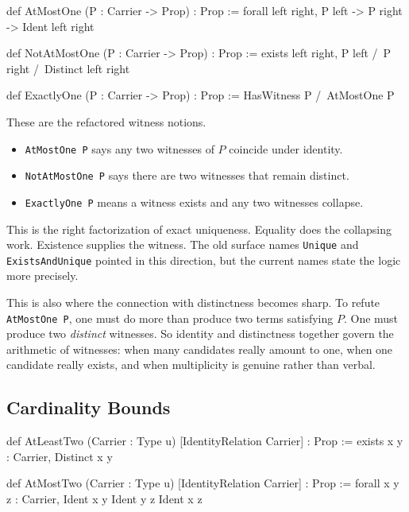 \documentclass[11pt]{article}
\newcommand{\leaninline}[1]{\texttt{#1}}
\begin{document}
\begin{leanblock}
def AtMostOne (P : Carrier -> Prop) : Prop :=
  forall left right, P left -> P right -> Ident left right

def NotAtMostOne (P : Carrier -> Prop) : Prop :=
  exists left right, P left /\ P right /\ Distinct left right

def ExactlyOne (P : Carrier -> Prop) : Prop :=
  HasWitness P /\ AtMostOne P
\end{leanblock}

These are the refactored witness notions.

\begin{itemize}[leftmargin=1.5em]
\item \leaninline{AtMostOne P} says any two witnesses of \(P\) coincide under identity.
\item \leaninline{NotAtMostOne P} says there are two witnesses that remain distinct.
\item \leaninline{ExactlyOne P} means a witness exists and any two witnesses collapse.
\end{itemize}

This is the right factorization of exact uniqueness. Equality does the collapsing work. Existence supplies the witness. The old surface names \leaninline{Unique} and \leaninline{ExistsAndUnique} pointed in this direction, but the current names state the logic more precisely.

This is also where the connection with distinctness becomes sharp. To refute \leaninline{AtMostOne P}, one must do more than produce two terms satisfying \(P\). One must produce two \emph{distinct} witnesses. So identity and distinctness together govern the arithmetic of witnesses: when many candidates really amount to one, when one candidate really exists, and when multiplicity is genuine rather than verbal.

\subsection{Cardinality Bounds}

\begin{leanblock}
def AtLeastTwo (Carrier : Type u) [IdentityRelation Carrier] : Prop :=
  exists x y : Carrier, Distinct x y

def AtMostTwo (Carrier : Type u) [IdentityRelation Carrier] : Prop :=
  forall x y z : Carrier, Ident x y \/ Ident y z \/ Ident x z
\end{leanblock}
\end{document}
